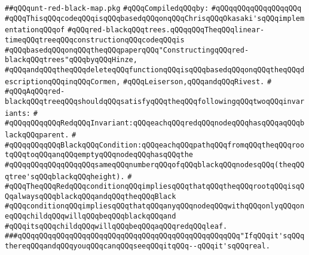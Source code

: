 \label{src/lib/src/unt-red-black-map.pkg}
\verb|##qQQqunt-red-black-map.pkg|\newline
\newline
\verb|#qQQqCompiledqQQqby:|\newline
\verb|#qQQqqQQqqQQqqQQqqQQq|\newline
\newline
\verb|#qQQqThisqQQqcodeqQQqisqQQqbasedqQQqonqQQqChrisqQQqOkasaki'sqQQqimplementationqQQqof|\newline
\verb|#qQQqred-blackqQQqtrees.qQQqqQQqTheqQQqlinear-timeqQQqtreeqQQqconstructionqQQqcodeqQQqis|\newline
\verb|#qQQqbasedqQQqonqQQqtheqQQqpaperqQQq"ConstructingqQQqred-blackqQQqtrees"qQQqbyqQQqHinze,|\newline
\verb|#qQQqandqQQqtheqQQqdeleteqQQqfunctionqQQqisqQQqbasedqQQqonqQQqtheqQQqdescriptionqQQqinqQQqCormen,|\newline
\verb|#qQQqLeiserson,qQQqandqQQqRivest.|\newline
\verb|#|\newline
\verb|#qQQqAqQQqred-blackqQQqtreeqQQqshouldqQQqsatisfyqQQqtheqQQqfollowingqQQqtwoqQQqinvariants:|\newline
\verb|#|\newline
\verb|#qQQqqQQqqQQqRedqQQqInvariant:qQQqeachqQQqredqQQqnodeqQQqhasqQQqaqQQqblackqQQqparent.|\newline
\verb|#|\newline
\verb|#qQQqqQQqqQQqBlackqQQqCondition:qQQqeachqQQqpathqQQqfromqQQqtheqQQqrootqQQqtoqQQqanqQQqemptyqQQqnodeqQQqhasqQQqthe|\newline
\verb|#qQQqqQQqqQQqqQQqqQQqsameqQQqnumberqQQqofqQQqblackqQQqnodesqQQq(theqQQqtree'sqQQqblackqQQqheight).|\newline
\verb|#|\newline
\verb|#qQQqTheqQQqRedqQQqconditionqQQqimpliesqQQqthatqQQqtheqQQqrootqQQqisqQQqalwaysqQQqblackqQQqandqQQqtheqQQqBlack|\newline
\verb|#qQQqconditionqQQqimpliesqQQqthatqQQqanyqQQqnodeqQQqwithqQQqonlyqQQqoneqQQqchildqQQqwillqQQqbeqQQqblackqQQqand|\newline
\verb|#qQQqitsqQQqchildqQQqwillqQQqbeqQQqaqQQqredqQQqleaf.|\newline
\newline
\newline
\verb|###qQQqqQQqqQQqqQQqqQQqqQQqqQQqqQQqqQQqqQQqqQQqqQQqqQQq"IfqQQqit'sqQQqthereqQQqandqQQqyouqQQqcanqQQqseeqQQqitqQQq--qQQqit'sqQQqreal.|\newline
